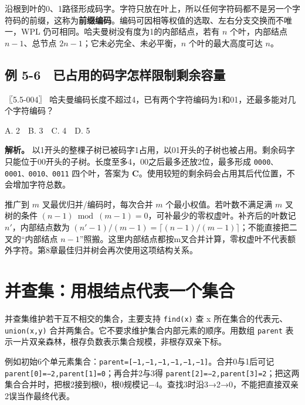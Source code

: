 沿根到叶的0、1路径形成码字。字符只放在叶上，所以任何字符码都不是另一个字符码的前缀，这称为\textbf{前缀编码}。编码可因相等权值的选取、左右分支交换而不唯一，WPL 仍可相同。哈夫曼树没有度为1的内部结点，若有 \(n\) 个叶，内部结点 \(n-1\)、总节点 \(2n-1\)；它未必完全、未必平衡，\(n\) 个叶的最大高度可达 \(n\)。

\subsection{例 5-6　已占用的码字怎样限制剩余容量}\label{ds-ex5-6}

\noindent{}〖5.5-004〗 哈夫曼编码长度不超过4，已有两个字符编码为1和01，还最多能对几个字符编码？

A. 2　B. 3　C. 4　D. 5


\textbf{解析。} 以1开头的整棵子树已被码字1占用，以01开头的子树也被占用。剩余码字只能位于00开头的子树。长度至多4，00之后最多还放2位，最多形成 \allowbreak{}\texttt{0000、0001、0010、0011} 四个叶，答案为 \textbf{C}。使用较短的剩余码会占用其后代位置，不会增加字符总数。

推广到 \(m\) 叉最优归并/编码时，每次合并 \(m\) 个最小权值。若叶数不满足满 \(m\) 叉树的条件 \((n-1)\bmod(m-1)=0\)，可补最少的零权虚叶。补齐后的叶数记 \(n'\)，内部结点数为 \((n'-1)/(m-1)=\lceil(n-1)/(m-1)\rceil\)；不能直接把二叉的``内部结点 \(n-1\)''照搬。这里内部结点都按m叉合并计算，零权虚叶不代表额外字符。第8章最佳归并树会再次使用这项结构关系。

\section{并查集：用根结点代表一个集合}\label{ds-05-10}

并查集维护若干互不相交的集合，主要支持 \allowbreak{}\texttt{find(x)} 查 x 所在集合的代表元、\allowbreak{}\texttt{union(x,}\allowbreak{}\texttt{y)} 合并两集合。它不要求维护集合内部元素的顺序。用数组 \allowbreak{}\texttt{parent} 表示一片双亲森林，根存负数表示集合规模，非根存双亲下标。

例如初始6个单元素集合：\allowbreak{}\texttt{parent={[}−1,}\allowbreak{}\texttt{−1,}\allowbreak{}\texttt{−1,}\allowbreak{}\texttt{−1,}\allowbreak{}\texttt{−1,}\allowbreak{}\texttt{−1{]}}。合并0与1后可记 \allowbreak{}\texttt{parent{[}0{]}=−2,}\allowbreak{}\texttt{parent{[}1{]}=0}；再合并2与3得 \allowbreak{}\texttt{parent{[}2{]}=−2,}\allowbreak{}\texttt{parent{[}3{]}=2}；把这两集合合并时，把根2接到根0，根0规模记−4。查找3时沿3→2→0，不能把直接双亲2误当作最终代表。

